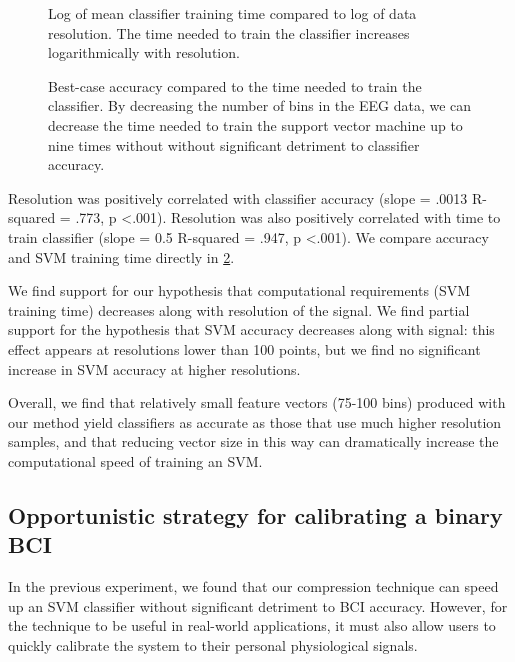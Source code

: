  \begin{figure}[!h]
  \vspace{-0.2cm}
  \centering
   {}
  \caption{Log of mean classifier training time compared to log of data resolution. The time needed to train the classifier increases logarithmically with resolution.}
  \label{fig:fig1b}
  \vspace{-0.1cm}
 \end{figure}

\begin{figure}[!h]
  \vspace{-0.2cm}
  \centering
   {}
  \caption{ Best-case accuracy compared to the time needed to train the classifier. By decreasing the number of bins in the EEG data, we can decrease the time needed to train the support vector machine up to nine times without without significant detriment to classifier accuracy. }
  \label{fig:fig1c}
  \vspace{-0.1cm}
 \end{figure}

Resolution was positively correlated with classifier accuracy (slope = .0013 R-squared = .773, p \textless .001). Resolution was also positively correlated with time to train classifier (slope = 0.5 R-squared = .947, p \textless .001). We compare accuracy and SVM training time directly in \ref{fig:fig1c}.

We find support for our hypothesis that computational requirements (SVM training time) decreases along with resolution of the signal. We find partial support for the hypothesis that SVM accuracy decreases along with signal: this effect appears at resolutions lower than 100 points, but we find no significant increase in SVM accuracy at higher resolutions.

Overall, we find that relatively small feature vectors (75-100 bins) produced with our method yield classifiers as accurate as those that use much higher resolution samples, and that reducing vector size in this way can dramatically increase the computational speed of training an SVM. 

\subsection{Opportunistic strategy for calibrating a binary BCI}

In the previous experiment, we found that our compression technique can speed up an SVM classifier without significant detriment to BCI accuracy. However, for the technique to be useful in real-world applications, it must also allow users to quickly calibrate the system to their personal physiological signals.

